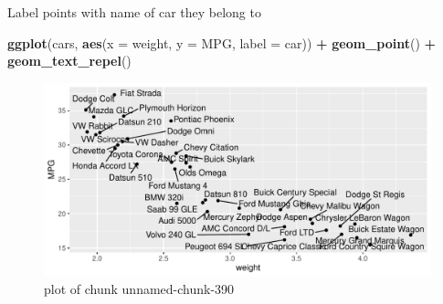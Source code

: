 \documentclass[ignorenonframetext,]{beamer}
\newenvironment{Shaded}{\begin{snugshade}}{\end{snugshade}}
\newcommand{\DataTypeTok}[1]{\textcolor[rgb]{0.13,0.29,0.53}{#1}}
\newcommand{\KeywordTok}[1]{\textcolor[rgb]{0.13,0.29,0.53}{\textbf{#1}}}
\newcommand{\NormalTok}[1]{#1}
\newcommand{\OperatorTok}[1]{\textcolor[rgb]{0.81,0.36,0.00}{\textbf{#1}}}
\newcommand{\StringTok}[1]{\textcolor[rgb]{0.31,0.60,0.02}{#1}}
\begin{document}
\begin{frame}[fragile]{Label points with name of car they belong to}
\protect\hypertarget{label-points-with-name-of-car-they-belong-to}{}

\begin{Shaded}
\begin{Highlighting}[]
\KeywordTok{ggplot}\NormalTok{(cars, }\KeywordTok{aes}\NormalTok{(}\DataTypeTok{x =}\NormalTok{ weight, }\DataTypeTok{y =}\NormalTok{ MPG, }\DataTypeTok{label =}\NormalTok{ car)) }\OperatorTok{+}
\StringTok{  }\KeywordTok{geom_point}\NormalTok{() }\OperatorTok{+}\StringTok{ }\KeywordTok{geom_text_repel}\NormalTok{()}
\end{Highlighting}
\end{Shaded}

\begin{figure}
\centering
\includegraphics{figure/unnamed-chunk-390-1.pdf}
\caption{plot of chunk unnamed-chunk-390}
\end{figure}

\end{frame}
\end{document}

